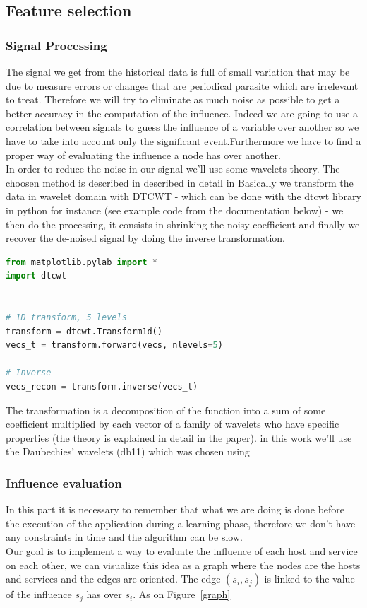 \documentclass[10pt,a4paper,oneside]{article}
\begin{document}
\begin{multicols}{2}

\subsection{Feature selection}
\subsubsection{Signal Processing}
The signal we get from the historical data is full of small variation that may be due to measure errors or changes that are periodical parasite which are irrelevant to treat. Therefore we will try to eliminate as much noise as possible to get a better accuracy in the computation of the influence. Indeed we are going to use a correlation between signals to guess the influence of a variable over another so we have to take into account only the significant event.Furthermore we have to find a proper way of evaluating the influence a node has over another.
\\
In order to reduce the noise in our signal we'll use some wavelets theory. The choosen method is described in described in detail in \cite{ref1} Basically we transform the data in wavelet domain with DTCWT - which can be done with the dtcwt library in python for instance (see example code from the documentation below) - we then do the processing, it consists in shrinking the noisy coefficient and finally we recover the de-noised signal by doing the inverse transformation.
\end{multicols}
\begin{lstlisting}[language=Python, caption=Python dtcwt library example]
from matplotlib.pylab import *
import dtcwt


# 1D transform, 5 levels
transform = dtcwt.Transform1d()
vecs_t = transform.forward(vecs, nlevels=5)

# Inverse
vecs_recon = transform.inverse(vecs_t)
\end{lstlisting}

\begin{multicols}{2}
The transformation is a decomposition of the function into a sum of some coefficient multiplied by each vector of a family of wavelets who have specific properties (the theory is explained in detail in the paper). in this work we'll use the Daubechies' wavelets (db11) which was chosen using \cite{ref2}
\subsubsection{Influence evaluation}
In this part it is necessary to remember that what we are doing is done before the execution of the application during a learning phase, therefore we don't have any constraints in time and the algorithm can be slow.
\\
Our goal is to implement a way to evaluate the influence of each host and service on each other, we can visualize this idea as a graph where the nodes are the hosts and services and the edges are oriented. The edge $(s_i,s_j)$ is linked to the value of the influence $s_j$ has over $s_i$. As on Figure~\ref{graph}
\end{multicols}
\end{document}
